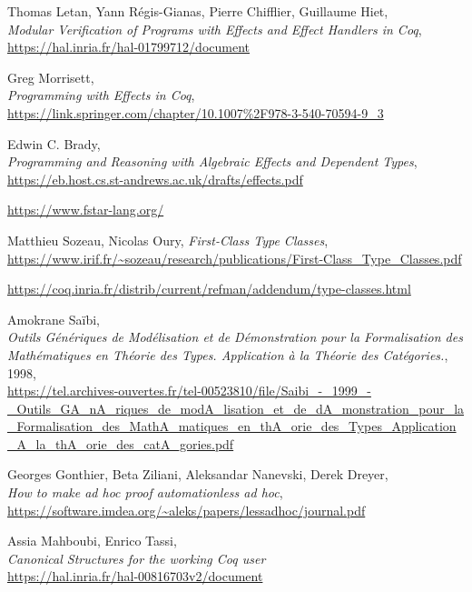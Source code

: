 \documentclass[declaration,inz,english,shortabstract]{iithesis}
\begin{document}
\begin{thebibliography}{1}
        Thomas Letan, Yann Régis-Gianas, Pierre Chifflier, Guillaume Hiet, \\
        \textit{Modular Verification of Programs with Effects and Effect Handlers in Coq}, \\
        \url{https://hal.inria.fr/hal-01799712/document}

        Greg Morrisett, \\
        \textit{Programming with Effects in Coq}, \\
        \url{https://link.springer.com/chapter/10.1007%2F978-3-540-70594-9_3}

        Edwin C. Brady, \\
        \textit{Programming and Reasoning with Algebraic Effects and Dependent Types}, \\
        \url{https://eb.host.cs.st-andrews.ac.uk/drafts/effects.pdf}

        \url{https://www.fstar-lang.org/}
    
        Matthieu Sozeau, Nicolas Oury,
        \textit{First-Class Type Classes}, \\
        \url{https://www.irif.fr/~sozeau/research/publications/First-Class_Type_Classes.pdf}

        \url{https://coq.inria.fr/distrib/current/refman/addendum/type-classes.html}

        Amokrane Saïbi, \\
        \textit{Outils Génériques de Modélisation et de Démonstration pour la Formalisation des Mathématiques en Théorie des Types. Application à la Théorie des Catégories.}, 1998, \\
        \url{https://tel.archives-ouvertes.fr/tel-00523810/file/Saibi_-_1999_-_Outils_GA_nA_riques_de_modA_lisation_et_de_dA_monstration_pour_la_Formalisation_des_MathA_matiques_en_thA_orie_des_Types_Application_A_la_thA_orie_des_catA_gories.pdf}

        Georges Gonthier, Beta Ziliani, Aleksandar Nanevski, Derek Dreyer, \\
        \textit{How to make ad hoc proof automationless ad hoc}, \\
        \url{https://software.imdea.org/~aleks/papers/lessadhoc/journal.pdf}

        Assia Mahboubi, Enrico Tassi, \\
        \textit{Canonical Structures for the working Coq user} \\
        \url{https://hal.inria.fr/hal-00816703v2/document}


\end{thebibliography}
\end{document}
